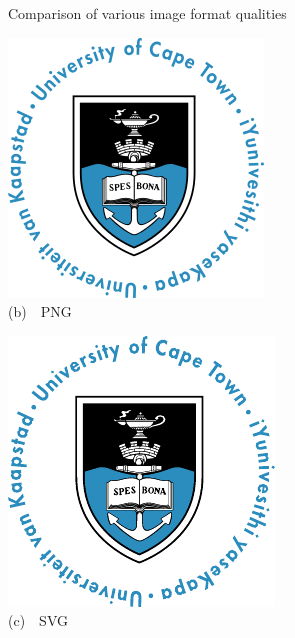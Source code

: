 \begin{FigureEnvironment}{Comparison of various image format qualities}
\begin{minipage}[b]{0.3\textwidth}
    \includegraphics[width=\textwidth]{../Figures/UCT.png}\\%
    {\small (b)~~PNG}%
  \end{minipage}
  \hfill
  \begin{minipage}[b]{0.3\textwidth}\centering\setlength{\parindent}{0mm}
    \includegraphics[width=\textwidth]{../Figures/UCT.pdf}\\%
    {\small (c)~~SVG}%
  \end{minipage}
  \hfill\mbox{}\\[1mm]
\end{FigureEnvironment}%

